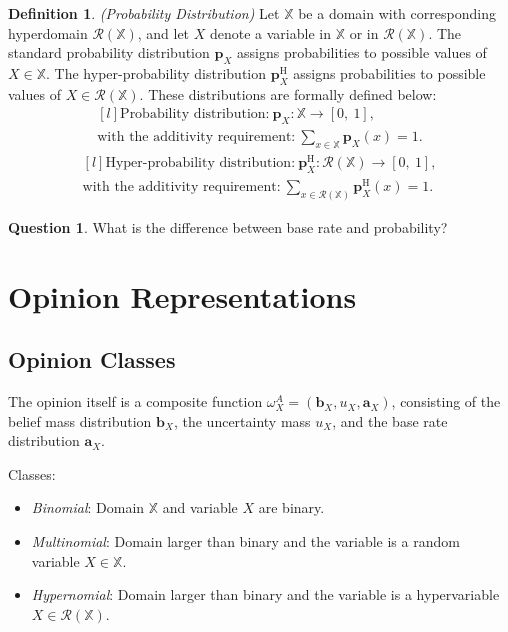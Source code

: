 \documentclass[a4paper,12pt]{article}
\theoremstyle{definition}
\newtheorem{question}{Question}[section]
\newtheorem{definition}{Definition}[section]
\numberwithin{equation}{section}
\begin{document}
\begin{definition}
	\emph{(Probability Distribution)} Let $\mathbb{X}$ be a domain with corresponding
hyperdomain $\mathcal{R}(\mathbb{X})$, and let $X$ denote a variable in $\mathbb{X}$ or in $\mathcal{R}(\mathbb{X})$. The standard probability distribution $\mathbf{p}_X$ assigns probabilities to possible values of $X \in \mathbb{X}$. The hyper-probability distribution $\mathbf{p}_X^\mathrm{H}$ assigns probabilities to possible values of $X \in \mathcal{R}(\mathbb{X})$. These distributions are formally defined below:
	\begin{equation}
		\begin{matrix*}[l]
			\text{Probability distribution:}\ \mathbf{p}_X : \mathbb{X} \rightarrow [0,\ 1], \\
			\text{with the additivity requirement:}\ \sum_{x \in \mathbb{X}} \mathbf{p}_X(x) = 1\text{.}
		\end{matrix*}
	\end{equation}
	\begin{equation}
		\begin{matrix*}[l]
			\text{Hyper-probability distribution:}\ \mathbf{p}_X^\mathrm{H} : \mathcal{R}(\mathbb{X}) \rightarrow [0,\ 1], \\
			\text{with the additivity requirement:}\ \sum_{x \in \mathcal{R}(\mathbb{X})} \mathbf{p}_X^\mathrm{H}(x) = 1\text{.}
		\end{matrix*}
	\end{equation}
\end{definition}

\begin{question}
	What is the difference between base rate and probability?
\end{question}

\section{Opinion Representations}

\subsection{Opinion Classes}

The opinion itself is a composite function $\omega^A_ X = \left(\mathbf{b}_X, u_X, \mathbf{a}_X\right)$, consisting of the belief mass distribution $\mathbf{b}_X$, the uncertainty mass $u_X$, and the base rate distribution $\mathbf{a}_X$.

Classes:
\begin{itemize}
	\item \emph{Binomial}: Domain $\mathbb{X}$ and variable $X$ are binary.
	\item \emph{Multinomial}: Domain larger than binary and the variable is a random variable $X \in \mathbb{X}$.
	\item \emph{Hypernomial}: Domain larger than binary and the variable is a hypervariable $X \in \mathcal{R}(\mathbb{X})$.
\end{itemize}
\end{document}
